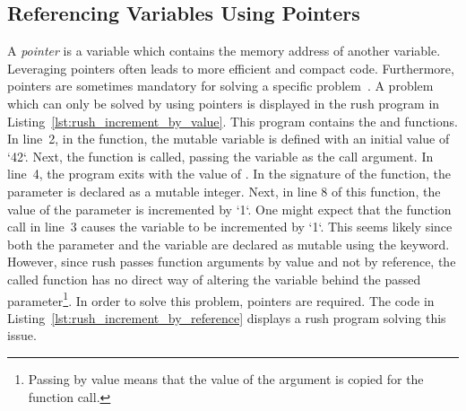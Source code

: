 \subsection{Referencing Variables Using Pointers}\label{sec:pointers}


A \emph{pointer} is a variable which contains the memory address of another variable.
Leveraging pointers often leads to more efficient and compact code.
Furthermore, pointers are sometimes mandatory for solving a specific problem~\cite[p.~93]{Ritchie1988}.
A problem which can only be solved by using pointers is displayed in the rush program in Listing~\ref{lst:rush_increment_by_value}.
This program contains the  and  functions.
In line~2, in the  function, the mutable variable  is defined with an initial value of `42`.
Next, the  function is called, passing the variable as the call argument.
In line~4, the program exits with the value of .
In the signature of the  function, the  parameter is declared as a mutable integer.
Next, in line 8 of this function, the value of the parameter is incremented by `1`.
One might expect that the function call in line~3 causes the variable  to be incremented by `1`.
This seems likely since both the parameter and the variable are declared as mutable using the  keyword.
However, since rush passes function arguments by value and not by reference, the called function has no direct way of altering the variable behind the passed parameter\footnote{Passing by value means that the value of the argument is copied for the function call.}.
In order to solve this problem, pointers are required.
The code in Listing~\ref{lst:rush_increment_by_reference} displays a rush program solving this issue.


